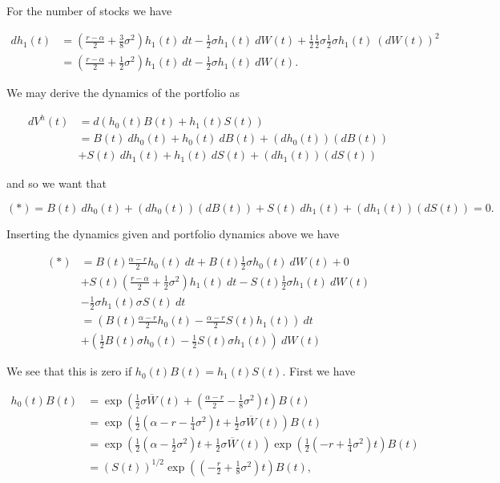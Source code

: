 \documentclass[
]{book}
\begin{document}
For the number of stocks we have

\begin{align*}
dh_1(t)&=\left(\frac{r-\alpha}{2}+\frac{3}{8}\sigma^2\right)h_1(t)\ dt-\frac{1}{2}\sigma h_1(t)\ dW(t)+ \frac{1}{2}\frac{1}{2}\sigma\frac{1}{2}\sigma h_1(t)\ (dW(t))^2\\
&=\left(\frac{r-\alpha}{2}+\frac{1}{2}\sigma^2\right)h_1(t)\ dt-\frac{1}{2}\sigma h_1(t)\ dW(t).
\end{align*}

We may derive the dynamics of the portfolio as

\begin{align*}
dV^h(t)&=d(h_0(t)B(t)+h_1(t)S(t))\\
&=B(t)\ dh_0(t)+h_0(t)\ dB(t)+(dh_0(t))(dB(t))\\
&+S(t)\ dh_1(t)+h_1(t)\ dS(t)+(dh_1(t))(dS(t))
\end{align*}

and so we want that

\[
(*)=B(t)\ dh_0(t)+(dh_0(t))(dB(t))+S(t)\ dh_1(t)+(dh_1(t))(dS(t))=0.
\]

Inserting the dynamics given and portfolio dynamics above we have

\begin{align*}
(*)&=B(t)\frac{\alpha - r}{2}h_0(t)\ dt+B(t)\frac{1}{2}\sigma h_0(t)\ dW(t)+0\\
&+S(t)\left(\frac{r-\alpha}{2}+\frac{1}{2}\sigma^2\right)h_1(t)\ dt-S(t)\frac{1}{2}\sigma h_1(t)\ dW(t)\\
&-\frac{1}{2}\sigma h_1(t)\sigma S(t) \ dt\\
&=\left(B(t)\frac{\alpha - r}{2}h_0(t)-\frac{\alpha-r}{2}S(t)h_1(t)\right)\ dt\\
&+\left(\frac{1}{2}B(t)\sigma h_0(t)-\frac{1}{2}S(t)\sigma h_1(t)\right)\ dW(t)
\end{align*}

We see that this is zero if \(h_0(t)B(t)=h_1(t)S(t)\). First we have

\begin{align*}
h_0(t)B(t)&=\exp\left(\frac{1}{2}\sigma\overline{W}(t)+\left(\frac{\alpha - r}{2}-\frac{1}{8}\sigma^2\right)t\right)B(t)\\
&=\exp\left(\frac{1}{2}\left(\alpha - r-\frac{1}{4}\sigma^2\right)t+\frac{1}{2}\sigma\overline{W}(t)\right)B(t)\\
&=\exp\left(\frac{1}{2}\left(\alpha-\frac{1}{2}\sigma^2\right)t+\frac{1}{2}\sigma\overline{W}(t)\right)\exp\left(\frac{1}{2}\left( - r+\frac{1}{4}\sigma^2\right)t\right)B(t)\\
&=(S(t))^{1/2}\exp\left(\left(-\frac{r}{2}+\frac{1}{8}\sigma^2\right)t\right)B(t),
\end{align*}
\end{document}
